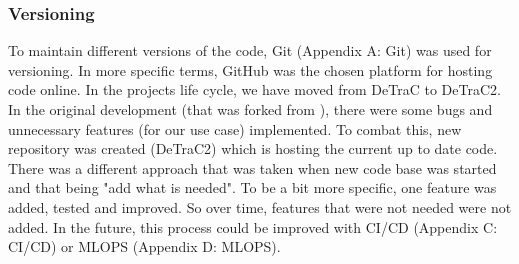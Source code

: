 \subsubsection{Versioning}
To maintain different versions of the code, Git (Appendix A: Git) was used for versioning. In more specific terms, GitHub was the chosen platform for hosting code online.
\newline
In the projects life cycle, we have moved from DeTraC to DeTraC2. In the original development (that was forked from \parencite{web:DeTraCGitHub}), there were some bugs and unnecessary features (for our use case) implemented. To combat this, new repository was created (DeTraC2) which is hosting the current up to date code. There was a different approach that was taken when new code base was started and that being "add what is needed". To be a bit more specific, one feature was added, tested and improved. So over time, features that were not needed were not added.
\newline
In the future, this process could be improved with CI/CD (Appendix C: CI/CD) or MLOPS (Appendix D: MLOPS).